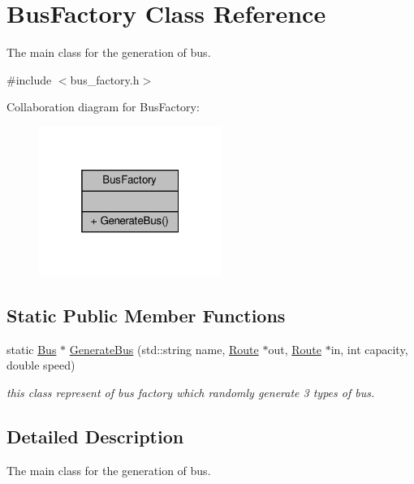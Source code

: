 \hypertarget{classBusFactory}{}\section{Bus\+Factory Class Reference}
\label{classBusFactory}


The main class for the generation of bus.  




{\ttfamily \#include $<$bus\+\_\+factory.\+h$>$}



Collaboration diagram for Bus\+Factory\+:\nopagebreak
\begin{figure}[H]
\begin{center}
\leavevmode
\includegraphics[width=169pt]{classBusFactory__coll__graph}
\end{center}
\end{figure}
\subsection*{Static Public Member Functions}
\begin{DoxyCompactItemize}
\item 
static \hyperlink{classBus}{Bus} $\ast$ \hyperlink{classBusFactory_aea064c9058b7c1592ae5c12ee409c747}{Generate\+Bus} (std\+::string name, \hyperlink{classRoute}{Route} $\ast$out, \hyperlink{classRoute}{Route} $\ast$in, int capacity, double speed)
\begin{DoxyCompactList}\small\item\em this class represent of bus factory which randomly generate 3 types of bus. \end{DoxyCompactList}\end{DoxyCompactItemize}


\subsection{Detailed Description}
The main class for the generation of bus. 


